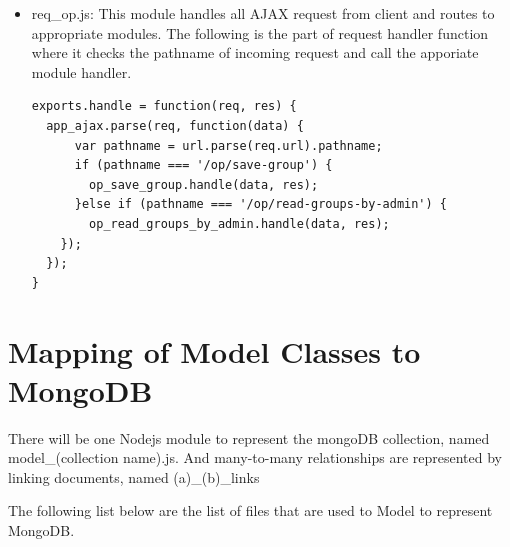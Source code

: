 \begin{itemize}
\item req{\_}op.js: This module handles all AJAX request from client and routes to appropriate modules. The following is the part of request handler function where it checks the pathname of incoming request and call the apporiate module handler.

\begin{lstlisting}
exports.handle = function(req, res) {
  app_ajax.parse(req, function(data) {
      var pathname = url.parse(req.url).pathname;
      if (pathname === '/op/save-group') {
        op_save_group.handle(data, res);
      }else if (pathname === '/op/read-groups-by-admin') {
        op_read_groups_by_admin.handle(data, res);
    });
  });
}
\end{lstlisting}
 
\end{itemize}

\section{Mapping of Model Classes to MongoDB}
There will be one Nodejs module to represent the mongoDB collection, named model{\_}(collection name).js. And many-to-many relationships are represented by linking documents, named (a){\_}(b){\_}links

The following list below are the list of files that are used to Model to represent MongoDB.

